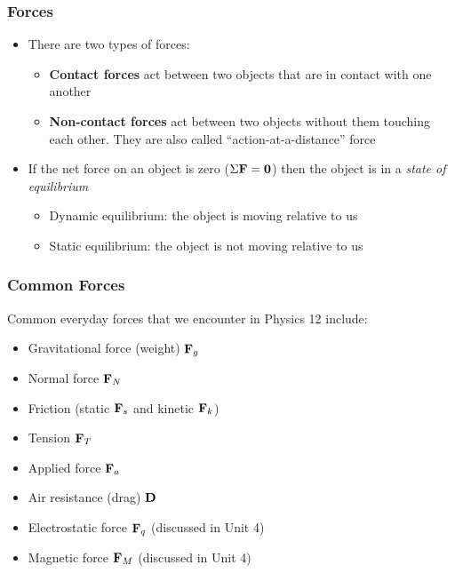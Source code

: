 \documentclass[12pt,compress,aspectratio=169]{beamer}
\newcommand{\mb}[1]{\ensuremath\mathbf{#1}}
\begin{document}
\begin{frame}
  \frametitle{Forces}
  \begin{itemize}
  \item There are two types of forces:
    \begin{itemize}
    \item\textbf{Contact forces} act between two objects that are in contact
      with one another
    \item\textbf{Non-contact forces} act between two objects without them
      touching each other. They are also called ``action-at-a-distance'' force
    \end{itemize}
    
  \item If the net force on an object is zero ($\Sigma\mb{F}=\mb{0}$) then the
    object is in a \emph{state of equilibrium}
    \begin{itemize}
    \item Dynamic equilibrium: the object is moving relative to us
    \item Static equilibrium: the object is not moving relative to us
    \end{itemize}  
  \end{itemize}
\end{frame}


\begin{frame}
  \frametitle{Common Forces}
  Common everyday forces that we encounter in Physics 12 include:
  \begin{itemize}
  \item Gravitational force (weight) $\mb{F}_g$
  \item Normal force $\mb{F}_N$
  \item Friction  (static $\mb{F}_s$ and kinetic $\mb{F}_k$)
  \item Tension $\mb{F}_T$
  \item Applied force $\mb{F}_a$
  \item Air resistance (drag) $\mb{D}$
  \item Electrostatic force $\mb{F}_q$ (discussed in Unit 4)
  \item Magnetic force $\mb{F}_M$ (discussed in Unit 4)
  \end{itemize}
\end{frame}
\end{document}
